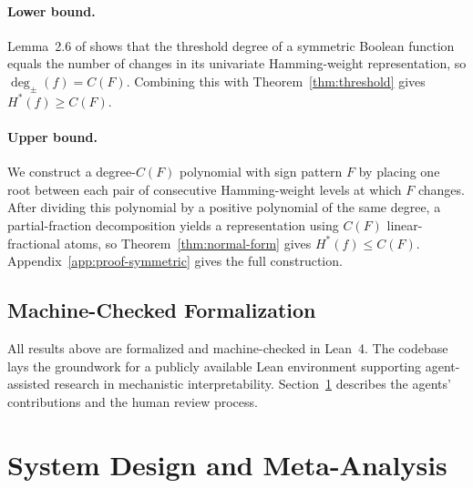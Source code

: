 \documentclass{article}
\theoremstyle{definition}
\theoremstyle{plain}
\newcommand{\hstar}{H^{\ast}}
\newcommand{\tdeg}{\deg_{\pm}}
\newcommand{\signchanges}{C(F)}
\newcommand{\gpt}{\textsc{GPT-5.6 Sol}\xspace}
\begin{document}
\paragraph{Lower bound.}
Lemma~2.6 of \citet{aspnes1994expressive} shows that the threshold degree of a symmetric Boolean function equals the number of changes in its univariate Hamming-weight representation, so $\tdeg(f)=\signchanges$. Combining this with Theorem~\ref{thm:threshold} gives $\hstar(f)\geq\signchanges$.

\paragraph{Upper bound.}
We construct a degree-$\signchanges$ polynomial with sign pattern $F$ by placing one root between each pair of consecutive Hamming-weight levels at which $F$ changes. After dividing this polynomial by a positive polynomial of the same degree, a partial-fraction decomposition yields a representation using $\signchanges$ linear-fractional atoms, so Theorem~\ref{thm:normal-form} gives $\hstar(f)\leq\signchanges$. Appendix~\ref{app:proof-symmetric} gives the full construction.

\subsection{Machine-Checked Formalization}

All results above are formalized and machine-checked in Lean~4. The codebase lays the groundwork for a publicly available Lean environment supporting agent-assisted research in mechanistic interpretability. Section~\ref{sec:system} describes the agents' contributions and the human review process.

\clearpage
\section{System Design and Meta-Analysis}
\label{sec:system}


\end{document}
